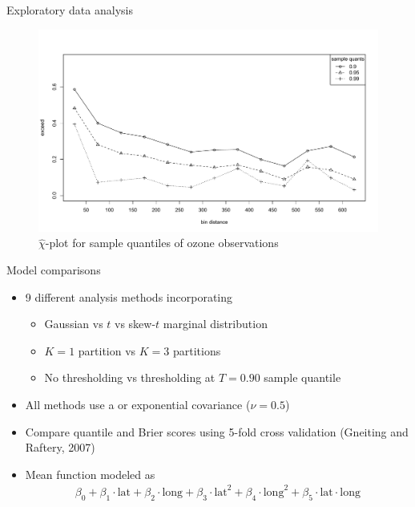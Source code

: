 \documentclass{beamer}
\begin{document}
\begin{frame}{Exploratory data analysis}
	\centering
  \begin{figure}
    \includegraphics[width=1\linewidth]{./plots/chi-plot-ozone-res.pdf}
    \caption{$\widehat{\chi}$-plot for sample quantiles of ozone observations}
  \end{figure}
\end{frame}

\begin{frame}{Model comparisons}
  \begin{itemize} \setlength{\itemsep}{0.5em}
    \item 9 different analysis methods incorporating
    \begin{itemize}
      \item Gaussian vs $t$ vs skew-$t$ marginal distribution
      \item $K=1$ partition vs $K=3$ partitions
      \item No thresholding vs thresholding at $T=0.90$ sample quantile
    \end{itemize}
    \item All methods use a \Matern or exponential covariance ($\nu = 0.5$)
    \item Compare quantile and Brier scores using 5-fold cross validation (Gneiting and Raftery, 2007)
    \item Mean function modeled as
    \begin{align*}
    	\beta_0 + \beta_1 \cdot \text{lat} + \beta_2 \cdot \text{long} +  \beta_3 \cdot \text{lat}^2 + \beta_4 \cdot \text{long}^2 + \beta_5 \cdot \text{lat} \cdot \text{long}
    \end{align*}
   \end{itemize}
\end{frame}
\end{document}
